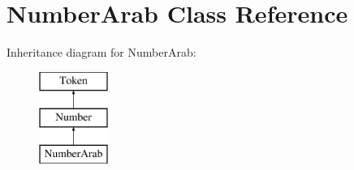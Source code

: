 \hypertarget{class_number_arab}{}\section{Number\+Arab Class Reference}
\label{class_number_arab}
Inheritance diagram for Number\+Arab\+:\begin{figure}[H]
\begin{center}
\leavevmode
\includegraphics[height=3.000000cm]{class_number_arab}
\end{center}
\end{figure}
